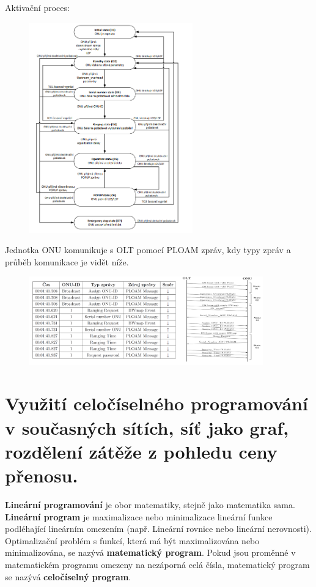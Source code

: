Aktivační proces:
\begin{figure} [h]
    \centering
    \includegraphics[width=0.63\textwidth]{snimky/proces.png}
    \label{fig:uml}
\end{figure}

Jednotka ONU komunikuje s OLT pomocí PLOAM zpráv, kdy typy zpráv a průběh komunikace je vidět níže.

\begin{figure} [h]
    \centering
    \includegraphics[width=0.9\textwidth]{snimky/aktivaceONU.png}
\end{figure}


\clearpage
\section{Využití celočíselného programování v současných sítích, síť jako graf, rozdělení zátěže z pohledu ceny přenosu.}
\textbf{Lineární programování} je obor matematiky, stejně jako matematika sama. \textbf{Lineární program} je maximalizace nebo minimalizace lineární funkce podléhající lineárním omezením (např. Lineární rovnice nebo lineární nerovnosti). Optimalizační problém s funkcí, která má být maximalizována nebo minimalizována, se nazývá \textbf{matematický program}. Pokud jsou proměnné v matematickém programu omezeny na nezáporná celá čísla, matematický program se nazývá \textbf{celočíselný program}.

